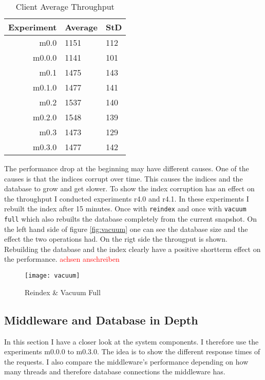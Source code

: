 \documentclass[
10pt, %
a4paper, %
oneside, %
headinclude,footinclude, %
BCOR5mm, %
]{scrartcl}
\newcommand\TODO[1]{\textcolor{red}{#1}}
\begin{document}
\begin{table}[H]

\caption{Client Average Throughput}
\centering
\begin{tabular}{|r|l|l|}
\toprule
Experiment & Average & StD\\
\midrule
m0.0	&	1151	&	112\\
m0.0.0 	& 	1141 	& 	101\\
m0.1 	&	1475	&	143\\
m0.1.0 	& 	1477 	& 	141\\
m0.2 	&	1537 	& 	140\\
m0.2.0 	& 	1548 	& 	139\\
m0.3 	& 	1473 	& 	129\\
m0.3.0 	& 	1477 	& 	142\\
\bottomrule
\end{tabular}
\label{tab:througput}
\end{table}

The performance drop at the beginning may have different causes. One of the causes is that the indices corrupt over time. This causes the indices and the database to grow and get slower. To show the index corruption has an effect on the throughput I conducted experiments r4.0 and r4.1. In these experiments I rebuilt the index after 15 minutes. Once with \texttt{reindex} and once with \texttt{vacuum full} which also rebuilts the database completely from the current snapshot. On the left hand side of figure \vref{fig:vacuum} one can see the database size and the effect the two operations had. On the rigt side the througput is shown. Rebuilding the database and the index clearly have a positive shortterm effect on the performance.
\TODO{achsen anschreiben}
\begin{figure}[H]
\centering
\texttt{[image: vacuum]}
\caption{Reindex \& Vacuum Full}
\label{fig:vacuum}
\end{figure}


\subsection{Middleware and Database in Depth}
\label{sec:middlewaretesting}
In this section I have a closer look at the system components. I therefore use the experiments m0.0.0 to m0.3.0. The idea is to show the different response times of the requests. I also compare the middleware's performance depending on how many threads and therefore database connections the middleware has. 
\end{document}
